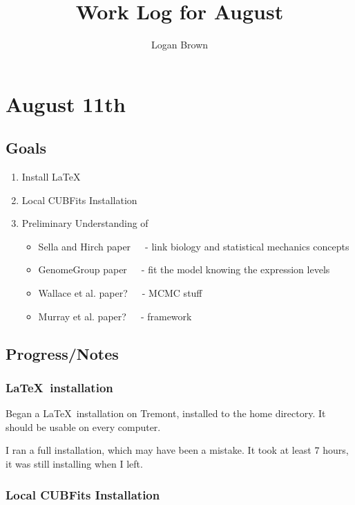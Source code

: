 \documentclass[11pt]{article} %
\title{Work Log for August}
\author{Logan Brown}
\begin{document}


\setcounter{section}{10}
\setcounter{subsection}{-1}
\setcounter{subsubsection}{0}

\section{August 11th}
\subsection{Goals}
\begin{enumerate}

\item Install \LaTeX
\item Local CUBFits Installation
\item Preliminary Understanding of
\begin{itemize}

\item Sella and Hirch paper~~~- link biology and statistical mechanics concepts
\item GenomeGroup paper~~~- fit the model knowing the expression levels
\item Wallace et al. paper?~~~- MCMC stuff
\item Murray et al. paper?~~~- framework

\end{itemize}
\end{enumerate}

\subsection{Progress/Notes}

\subsubsection{\LaTeX~installation}

Began a \LaTeX~installation on Tremont, installed to the home directory. It should be usable on every computer.

I ran a full installation, which may have been a mistake. It took at least 7 hours, it was still installing when I left.

\subsubsection{Local CUBFits Installation}
\end{document}
